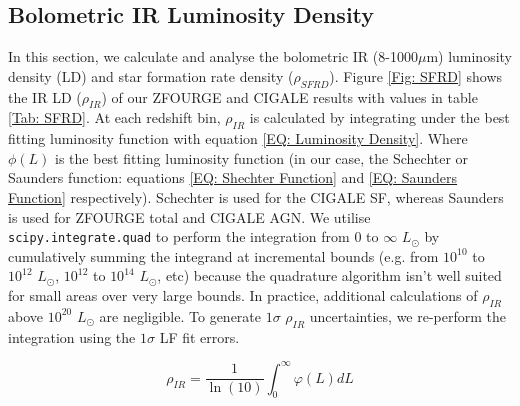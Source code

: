 \subsection{Bolometric IR Luminosity Density} \label{Sec: IR Density}
In this section, we calculate and analyse the bolometric IR (8-1000$\mu$m) luminosity density (LD) and star formation rate density ($\rho_{SFRD}$). Figure \ref{Fig: SFRD} shows the IR LD ($\rho_{IR}$) of our ZFOURGE and CIGALE results with values in table \ref{Tab: SFRD}. At each redshift bin, $\rho_{IR}$ is calculated by integrating under the best fitting luminosity function with equation \ref{EQ: Luminosity Density}. Where $\phi(L)$ is the best fitting luminosity function (in our case, the Schechter or Saunders function: equations \ref{EQ: Shechter Function} and \ref{EQ: Saunders Function} respectively). Schechter is used for the CIGALE SF, whereas Saunders is used for ZFOURGE total and CIGALE AGN. We utilise \texttt{scipy.integrate.quad} \citep{virtanen_scipy_2020} to perform the integration from $0$ to $\infty$ $L_{\odot}$ by cumulatively summing the integrand at incremental bounds (e.g. from $10^{10}$ to $10^{12}$ $L_{\odot}$, $10^{12}$ to $10^{14}$ $L_{\odot}$, etc) because the quadrature algorithm isn't well suited for small areas over very large bounds. In practice, additional calculations of $\rho_{IR}$ above $10^{20}$ $L_{\odot}$ are negligible. To generate $1\sigma$ $\rho_{IR}$ uncertainties, we re-perform the integration using the $1 \sigma$ LF fit errors.

\begin{equation} 
    \rho_{IR} = \frac{1}{\ln(10)} \int_{0}^{\infty} \varphi(L) dL 
    \label{EQ: Luminosity Density}
\end{equation}

